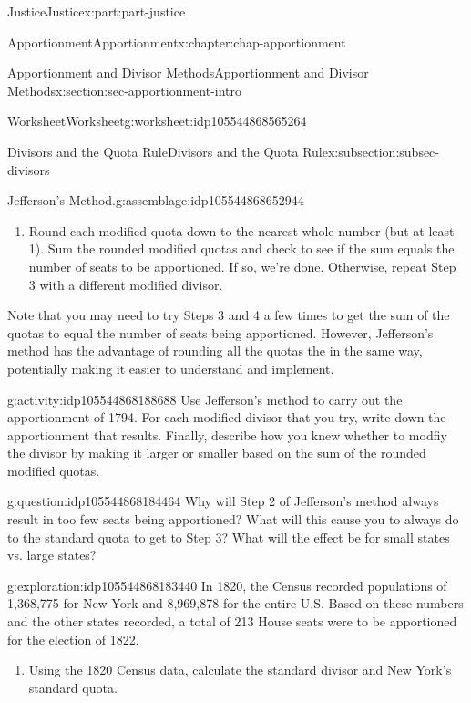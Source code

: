 \documentclass[oneside,10pt,]{book}
\numberwithin{equation}{section}
\begin{document}
\begin{partptx}{Justice}{}{Justice}{}{}{x:part:part-justice}
\begin{chapterptx}{Apportionment}{}{Apportionment}{}{}{x:chapter:chap-apportionment}
\begin{sectionptx}{Apportionment and Divisor Methods}{}{Apportionment and Divisor Methods}{}{}{x:section:sec-apportionment-intro}
\begin{worksheet-subsection}{Worksheet}{}{Worksheet}{}{}{g:worksheet:idp105544868565264}
\begin{subsectionptx}{Divisors and the Quota Rule}{}{Divisors and the Quota Rule}{}{}{x:subsection:subsec-divisors}
\begin{assemblage}{Jefferson's Method.}{g:assemblage:idp105544868652944}
\begin{enumerate}[label=(\alph*)]
\item{}Round each modified quota down to the nearest whole number (but at least 1). Sum the rounded modified quotas and check to see if the sum equals the number of seats to be apportioned. If so, we're done. Otherwise, repeat Step 3 with a different modified divisor.%
\end{enumerate}
%
\end{assemblage}
Note that you may need to try Steps 3 and 4 a few times to get the sum of the quotas to equal the number of seats being apportioned. However, Jefferson's method has the advantage of rounding all the quotas the in the same way, potentially making it easier to understand and implement.%
\begin{activity}{}{g:activity:idp105544868188688}%
Use Jefferson's method to carry out the apportionment of 1794\footnotemark{}. For each modified divisor that you try, write down the apportionment that results. Finally, describe how you knew whether to modfiy the divisor by making it larger or smaller based on the sum of the rounded modified quotas.%
\end{activity}%
%
%
\begin{question}{}{g:question:idp105544868184464}%
Why will Step 2 of Jefferson's method always result in too few seats being apportioned? What will this cause you to always do to the standard quota to get to Step 3? What will the effect be for small states vs. large states?%
\end{question}
\begin{exploration}{}{g:exploration:idp105544868183440}%
In 1820, the Census recorded populations of 1,368,775 for New York and 8,969,878 for the entire U.S. Based on these numbers and the other states recorded, a total of 213 House seats were to be apportioned for the election of 1822.%
%
\begin{enumerate}[label=(\alph*)]
\item{}Using the 1820 Census data, calculate the standard divisor and New York's standard quota.%

\end{enumerate}
\end{exploration}
\end{subsectionptx}
\end{worksheet-subsection}
\end{sectionptx}
\end{chapterptx}
\end{partptx}
\end{document}
